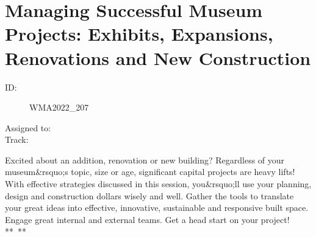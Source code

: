 \documentclass{report}
\begin{document}
        
          \newpage
          \section{ Managing Successful Museum Projects: Exhibits, Expansions, Renovations and New Construction }
            \begin{description}
              \item [ID:]
              WMA2022\_207

              \item [Assigned to:]
                \item [Track:]
              \end{description}

              Excited about an addition, renovation or new building? Regardless of your museum\&rsquo;s topic, size or age, significant capital projects are heavy lifts! With effective strategies discussed in this session, you\&rsquo;ll use your planning, design and construction dollars wisely and well. Gather the tools to translate your great ideas into effective, innovative, sustainable and responsive built space. Engage great internal and external teams. Get a head start on your project!
** **
\end{document}
